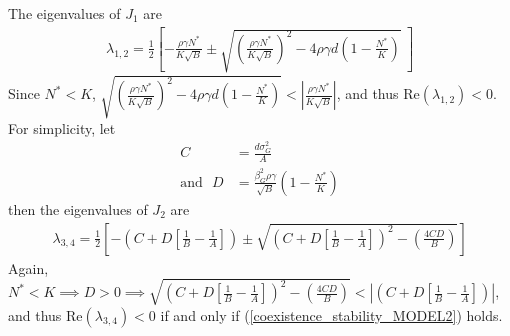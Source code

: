 \documentclass{amsart}
\theoremstyle{definition}
\theoremstyle{remark}
\numberwithin{equation}{section}
\begin{document}
The eigenvalues of $J_1$ are
\begin{align*}
	\lambda_{1,2} = \frac{1}{2}\left[-\frac{\rho\gamma N^*}{K\sqrt{B}} \pm \sqrt{\left(\frac{\rho\gamma N^*}{K\sqrt{B}}\right)^2 - 4\rho\gamma d\left(1 - \frac{N^*}{K}\right)}\ \right]
\end{align*}
Since $N^* < K$, $\sqrt{\left(\frac{\rho\gamma N^*}{K\sqrt{B}}\right)^2 - 4\rho\gamma d\left(1 - \frac{N^*}{K}\right)} < \left|\frac{\rho\gamma N^*}{K\sqrt{B}}\right|$, and thus $\text{Re}(\lambda_{1,2}) < 0$. \\

\noindent For simplicity, let
\begin{align*}
	C &= \frac{d\sigma_G^2}{A} \\
	\text{and} \ \ \ D &= \frac{\beta_G^2\rho\gamma}{\sqrt{B}}\left(1 - \frac{N^*}{K}\right)
\end{align*}
then the eigenvalues of $J_2$ are
\begin{align*}
	\lambda_{3,4} = \frac{1}{2}\left[-\left(C + D\left[\frac{1}{B} - \frac{1}{A} \right]\right) \pm \sqrt{\left(C + D\left[\frac{1}{B} - \frac{1}{A} \right]\right)^2 - \left(\frac{4CD}{B}\right)}\right]
\end{align*}
Again, $N^* < K \implies D > 0 \implies \sqrt{\left(C + D\left[\frac{1}{B} - \frac{1}{A} \right]\right)^2 - \left(\frac{4CD}{B}\right)} < \left|\left(C + D\left[\frac{1}{B} - \frac{1}{A} \right]\right)\right|$, and thus $\text{Re}(\lambda_{3,4}) < 0$ if and only if (\ref{coexistence_stability_MODEL2}) holds.
\end{document}
